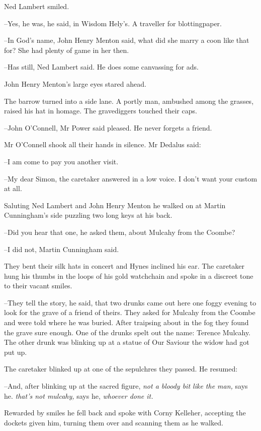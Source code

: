 Ned Lambert smiled.

--Yes, he was,
he said,
in Wisdom Hely's.
A traveller for blottingpaper.

--In God's name,
John Henry Menton said,
what did she marry a coon like that for?
She had plenty of game in her then.

--Has still,
Ned Lambert said.
He does some canvassing for ads.

John Henry Menton's large eyes stared ahead.

The barrow turned into a side lane.
A portly man, ambushed among the grasses, raised his hat in homage.
The gravediggers touched their caps.

--John O'Connell,
Mr Power said pleased.
He never forgets a friend.

Mr O'Connell shook all their hands in silence.
Mr Dedalus said:

--I am come to pay you another visit.

--My dear Simon,
the caretaker answered in a low voice.
I don't want your custom at all.

Saluting Ned Lambert and John Henry Menton
he walked on at Martin Cunningham's side
puzzling two long keys at his back.

--Did you hear that one,
he asked them,
about Mulcahy from the Coombe?

--I did not,
Martin Cunningham said.

They bent their silk hats in concert and Hynes inclined his ear.
The caretaker hung his thumbs in the loops of his gold watchchain
and spoke in a discreet tone to their vacant smiles.

--They tell the story,
he said,
that two drunks came out here one foggy
evening to look for the grave of a friend of theirs.
They asked for Mulcahy from the Coombe and were told where he was buried.
After traipsing about in the fog they found the grave sure enough.
One of the drunks spelt out the name:
Terence Mulcahy.
The other drunk was blinking up at a statue of Our Saviour
the widow had got put up.

The caretaker blinked up at one of the sepulchres they passed.
He resumed:

--And, after blinking up at the sacred figure,
\emph{not a bloody bit like the man,} says he.
\emph{that's not mulcahy,} says he,
\emph{whoever done it.}

Rewarded by smiles
he fell back and spoke with Corny Kelleher,
accepting the dockets given him,
turning them over and scanning them as he walked.

